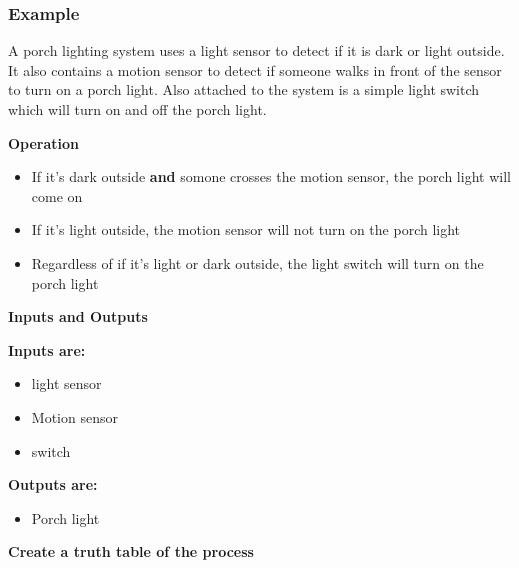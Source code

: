 \documentclass[a4paper,12pt]{article}
\newenvironment{6mini}{
  \begin{minipage}{6cm}
}{
  \end{minipage}
}
\begin{document}
        \subsubsection*{Example}
            A porch lighting system uses a light sensor to detect if it is dark or light outside. It also contains a motion sensor to detect if someone walks in front of the sensor to turn on a porch light. Also
            attached to the system is a simple light switch which will turn on and off the porch light.
            \begin{center}\textbf{Operation}\end{center}
                \begin{itemize}
                    \item If it's dark outside \textbf{and} somone crosses the motion sensor, the porch light will come on
                    \item If it's light outside, the motion sensor will not turn on the porch light
                    \item Regardless of if it's light or dark outside, the light switch will turn on the porch light
                \end{itemize}
            
            \begin{center}\textbf{Inputs and Outputs}\end{center}
            \begin{6mini}
                \textbf{Inputs are:}
                \begin{itemize}
                    \item light sensor
                    \item Motion sensor
                    \item switch
                \end{itemize}
                \end{6mini}
                \begin{6mini} \vspace{6pt}
                    \textbf{Outputs are:}
                    \begin{itemize}
                        \item Porch light
                    \end{itemize}
                \end{6mini}
            \begin{center}\textbf{Create a truth table of the process}\end{center}
\end{document}
